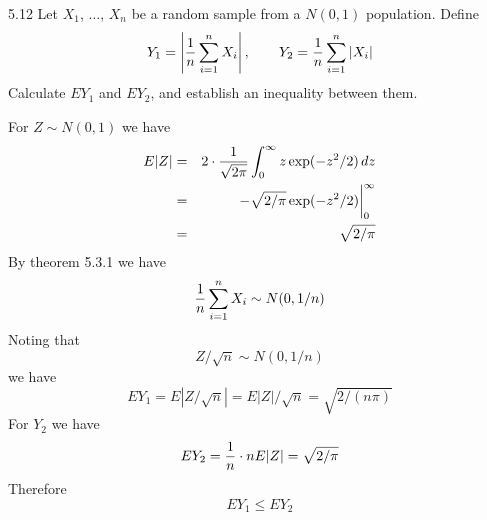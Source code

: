 \documentclass[12pt]{article}
\begin{document}
5.12
Let $X_1$, $\ldots$, $X_n$ be a random sample from a $N(0,1)$
population. Define
$$Y_1=\left|{1\over n}\sum_{i=1}^n X_i\right|,\qquad
Y_2={1\over n}\sum_{i=1}^n|X_i|$$
Calculate $EY_1$ and $EY_2$, and establish an inequality between
them.

\bigskip
\noindent
For $Z\sim N(0,1)$ we have
\begin{eqnarray*}
E|Z|&=&2\cdot{1\over\sqrt{2\pi}}\int_0^\infty z\exp(-z^2/2)\,dz\\
&=&-\sqrt{2/\pi}\exp(-z^2/2)\bigg|_0^\infty\\
&=&\sqrt{2/\pi}
\end{eqnarray*}
By theorem 5.3.1 we have
$${1\over n}\sum_{i=1}^nX_i\sim N(0,1/n)$$
Noting that
$$Z/\sqrt n\sim N(0,1/n)$$
we have
$$EY_1=E|Z/\sqrt n|=E|Z|/\sqrt n=\sqrt{2/(n\pi)}$$
For $Y_2$ we have
$$EY_2={1\over n}\cdot nE|Z|=\sqrt{2/\pi}$$
Therefore
$$EY_1\le EY_2$$
\end{document}
